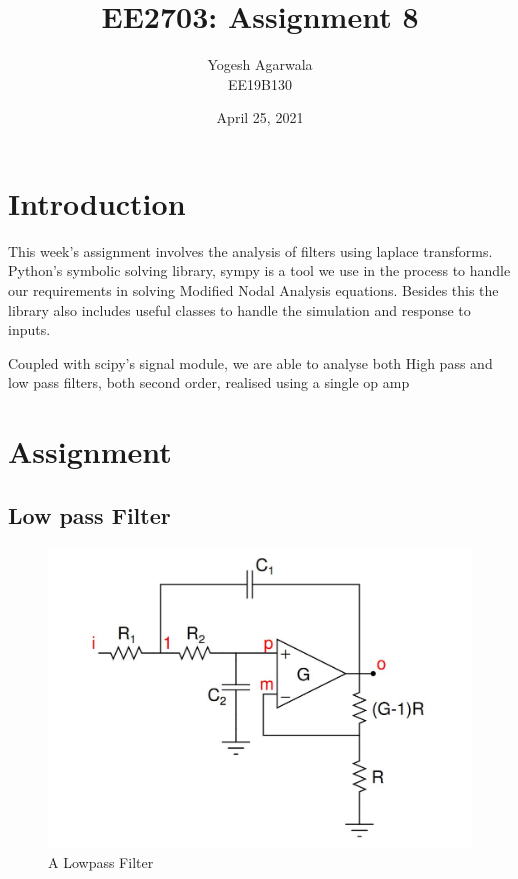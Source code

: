 \documentclass{article}
\title{EE2703: Assignment 8}
\author{Yogesh Agarwala \\ EE19B130}
\date{April 25, 2021}
\begin{document}
\maketitle

\section{Introduction}
This week's assignment involves the analysis of filters using laplace transforms. Python's symbolic solving library, sympy is a tool we use in the process to handle our requirements in solving Modified Nodal Analysis  equations. Besides this the library also includes useful classes to handle the simulation and response to inputs.

Coupled with scipy's signal module, we are able to analyse both High pass and low pass filters, both second order, realised using a single op amp



\section{Assignment}
\subsection{Low pass Filter}
\begin{figure}[h!]
	\centering
	\includegraphics[scale=0.4]{lowpass.jpg}
	\caption{A Lowpass Filter}
	\label{fig:A Lowpass Filter}
\end{figure}

\clearpage
\end{document}
